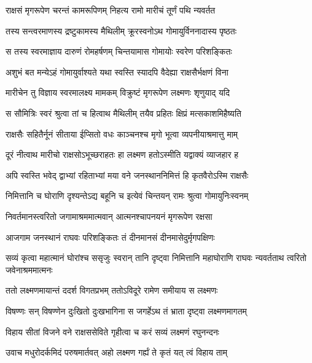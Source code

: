 
\twolineshloka
{राक्षसं मृगरूपेण चरन्तं कामरूपिणम्}
{निहत्य रामो मारीचं तूर्णं पथि न्यवर्तत} %

\twolineshloka
{तस्य सन्त्वरमाणस्य द्रष्टुकामस्य मैथिलीम्}
{क्रूरस्वनोऽथ गोमायुर्विननादास्य पृष्ठतः} %

\twolineshloka
{स तस्य स्वरमाज्ञाय दारुणं रोमहर्षणम्}
{चिन्तयामास गोमायोः स्वरेण परिशङ्कितः} %

\twolineshloka
{अशुभं बत मन्येऽहं गोमायुर्वाश्यते यथा}
{स्वस्ति स्यादपि वैदेह्या राक्षसैर्भक्षणं विना} %

\twolineshloka
{मारीचेन तु विज्ञाय स्वरमालक्ष्य मामकम्}
{विक्रुष्टं मृगरूपेण लक्ष्मणः शृणुयाद् यदि} %

\twolineshloka
{स सौमित्रिः स्वरं श्रुत्वा तां च हित्वाथ मैथिलीम्}
{तयैव प्रहितः क्षिप्रं मत्सकाशमिहैष्यति} %

\twolineshloka
{राक्षसैः सहितैर्नूनं सीताया ईप्सितो वधः}
{काञ्चनश्च मृगो भूत्वा व्यपनीयाश्रमात्तु माम्} %

\twolineshloka
{दूरं नीत्वाथ मारीचो राक्षसोऽभूच्छराहतः}
{हा लक्ष्मण हतोऽस्मीति यद्वाक्यं व्याजहार ह} %

\twolineshloka
{अपि स्वस्ति भवेद् द्वाभ्यां रहिताभ्यां मया वने}
{जनस्थाननिमित्तं हि कृतवैरोऽस्मि राक्षसैः} %

\twolineshloka
{निमित्तानि च घोराणि दृश्यन्तेऽद्य बहूनि च}
{इत्येवं चिन्तयन् रामः श्रुत्वा गोमायुनिःस्वनम्} %

\twolineshloka
{निवर्तमानस्त्वरितो जगामाश्रममात्मवान्}
{आत्मनश्चापनयनं मृगरूपेण रक्षसा} %

\twolineshloka
{आजगाम जनस्थानं राघवः परिशङ्कितः}
{तं दीनमानसं दीनमासेदुर्मृगपक्षिणः} %

\threelineshloka
{सव्यं कृत्वा महात्मानं घोरांश्च ससृजुः स्वरान्}
{तानि दृष्ट्वा निमित्तानि महाघोराणि राघवः}
{न्यवर्तताथ त्वरितो जवेनाश्रममात्मनः} %

\twolineshloka
{ततो लक्ष्मणमायान्तं ददर्श विगतप्रभम्}
{ततोऽविदूरे रामेण समीयाय स लक्ष्मणः} %

\twolineshloka
{विषण्णः सन् विषण्णेन दुःखितो दुःखभागिना}
{स जगर्हेऽथ तं भ्राता दृष्ट्वा लक्ष्मणमागतम्} %

\twolineshloka
{विहाय सीतां विजने वने राक्षससेविते}
{गृहीत्वा च करं सव्यं लक्ष्मणं रघुनन्दनः} %

\twolineshloka
{उवाच मधुरोदर्कमिदं परुषमार्तवत्}
{अहो लक्ष्मण गर्ह्यं ते कृतं यत् त्वं विहाय ताम्} %

